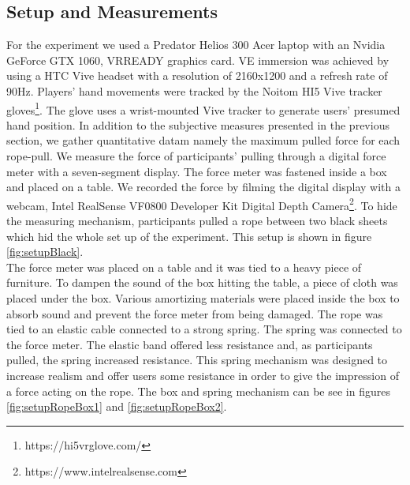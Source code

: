 \subsection{Setup and Measurements}
\label{subsection:SetupMeasurements}
For the experiment we used a Predator Helios 300 Acer laptop with an Nvidia GeForce GTX 1060, VRREADY graphics card. VE immersion was achieved by using a HTC Vive headset with a resolution of 2160x1200 and a refresh rate of 90Hz. 
Players' hand movements were tracked by the Noitom HI5 Vive tracker gloves\footnote{https://hi5vrglove.com/}. The glove uses a wrist-mounted Vive tracker to generate users' presumed hand position. 
In addition to the subjective measures presented in the previous section, we gather quantitative datam namely the maximum pulled force for each rope-pull. We measure the force of participants' pulling through a digital force meter with a seven-segment display. The force meter was fastened inside a box and placed on a table. We recorded the force by filming the digital display with a webcam, Intel RealSense VF0800 Developer Kit Digital Depth Camera\footnote{https://www.intelrealsense.com}.
To hide the measuring mechanism, participants pulled a rope between two black sheets which hid the whole set up of the experiment. This setup is shown in figure \ref{fig:setupBlack}.\\
The force meter was placed on a table and it was tied to a heavy piece of furniture. To dampen the sound of the box hitting the table, a piece of cloth was placed under the box. Various amortizing materials were placed inside the box to absorb sound and prevent the force meter from being damaged. The rope was tied to an elastic cable connected to a strong spring. The spring was connected to the force meter. The elastic band offered less resistance and, as participants pulled, the spring increased resistance. This spring mechanism was designed to increase realism and offer users some resistance in order to give the impression of a force acting on the rope. The box and spring mechanism can be see in figures \ref{fig:setupRopeBox1} and \ref{fig:setupRopeBox2}.\\

